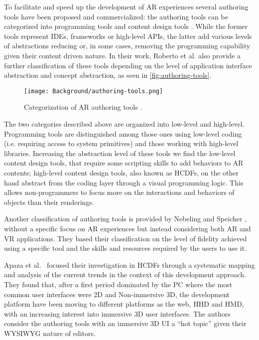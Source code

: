 To facilitate and speed up the development of AR experiences several authoring tools have been proposed and commercialized: the authoring tools can be categorized into programming tools and content design tools \cite{marcus_authoring_2016}. While the former tools represent IDEs, frameworks or high-level APIs, the latter add various levels of abstractions reducing or, in some cases, removing the programming capability given their content driven nature.
In their work, Roberto et al. also provide a further classification of these tools depending on the level of application interface abstraction and concept abstraction, as seen in \autoref{fig:authoring-tools}.
\begin{figure}[h]
	\centering
	\texttt{[image: Background/authoring-tools.png]}
	\caption{Categorization of AR authoring tools \cite{marcus_authoring_2016}.}
	\label{fig:authoring-tools}
\end{figure}
The two categories described above are organized into low-level and high-level. Programming tools are distinguished among those ones using low-level coding (i.e. requiring access to system primitives) and those working with high-level libraries.
Increasing the abstraction level of these tools we find the low-level content design tools, that require some scripting skills to add behaviors to AR contents; high-level content design tools, also known as \glspl{HCDF}, on the other hand abstract from the coding layer through a visual programming logic. This allows non-programmers to focus more on the interactions and behaviors of objects than their renderings.

Another classification of authoring tools is provided by Nebeling and Speicher \cite{nebeling_trouble_2018}, without a specific focus on AR experiences but instead considering both AR and VR applications. They based their classification on the level of fidelity achieved using a specific tool and the skills and resources required by the users to use it.

Apaza et al.~\cite{apaza_systematic_2018} focused their investigation in \glspl{HCDF} through a systematic mapping and analysis of the current trends in the context of this development approach. 
They found that, after a first period dominated by the PC where the most common user interfaces were 2D and Non-immersive 3D, the development platform have been moving to different platforms as the web, \gls{HHD} and \gls{HMD}, with an increasing interest into immersive 3D user interfaces. The authors consider the authoring tools with an immersive 3D UI a “hot topic” given their WYSIWYG nature of editors.

